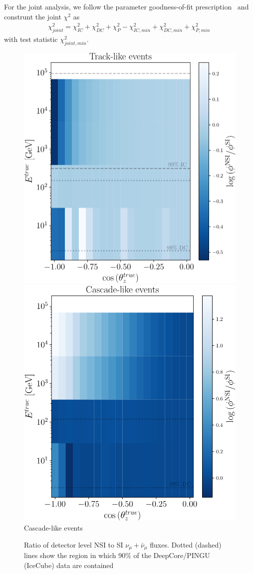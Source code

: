 \documentclass[draft=True]{revtex4-2}
\begin{document}
For the joint analysis, we follow the parameter goodness-of-fit prescription~\cite{maltoni2003} and construnt the joint $\chi^2$ as 
\begin{align}
    \chi^2_{joint} = \chi^2_{IC} + \chi^2_{DC} + \chi^2_{P} - \chi^2_{IC,min} + \chi^2_{DC,min} + \chi^2_{P,min}\,
\end{align}
with test statistic $\chi^2_{joint,min}$.

\begin{figure}[!tb]
    \begin{center}
       \includegraphics[width=0.4\linewidth]{figures/track_flux_ratio.pdf}
       \includegraphics[width=0.4\linewidth]{figures/cascade_flux_ratio.pdf}
       Cascade-like events
    \end{center}
    \caption{Ratio of detector level NSI to SI $\nu_\mu + \bar\nu_\mu$ fluxes. Dotted (dashed) lines show the region in which 90\% of the 
    DeepCore/PINGU (IceCube) data are contained}\label{fig:flux_ratio}
 \end{figure}


\end{document}
